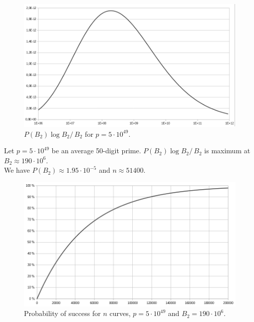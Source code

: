 \documentclass[a4paper, 11pt, pdftex]{report}
\theoremstyle{plain}
\theoremstyle{definition}
\begin{document}
\begin{figure}[!h]
	\centering
	\includegraphics[width=15.5cm, angle=0]{img/cond_max.pdf}
	\caption{\label{fig:max} $P(B_2) \log B_2 /\, B_2$ for $p = 5\cdot10^{49}$.}
\end{figure}

Let $p = 5\cdot10^{49}$ be an average 50-digit prime.
$P(B_2) \log B_2 /\, B_2$ is maximum at $B_2 \approx 190\cdot 10^6$.\\
We have $P(B_2) \approx 1.95\cdot 10^{-5}$ and $n \approx 51400$.

\begin{figure}[!ht]
	\centering
	\includegraphics[width=15.5cm, angle=0]{img/n_curves.pdf}
	\caption{\label{fig:p_n} Probability of success for $n$ curves, $p = 5\cdot10^{49}$ and $B_2 = 190\cdot 10^6$.}
\end{figure}
\end{document}
